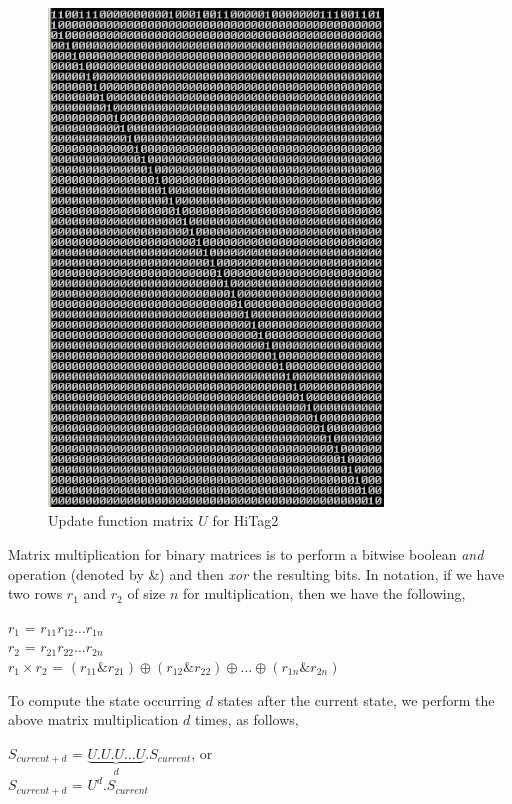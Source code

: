 \begin{figure}[h!]
	\centering
	\includegraphics[width=3.5in]{./figures/hitag2-transition-matrix.png}
	\caption{Update function matrix $U$ for HiTag2}	
	\label{fig:hitag2-transition-matrix}
\end{figure}

Matrix multiplication for binary matrices is to perform a bitwise boolean \emph{and} operation (denoted by \&) and then \emph{xor} the resulting bits. In notation, if we have two rows $r_1$ and $r_2$ of size $n$ for multiplication, then we have the following,

\begin{center}
\large{$r_1$ = $r_{11} r_{12} \ldots r_{1n}$}\\
\large{$r_2$ = $r_{21} r_{22} \ldots r_{2n}$}\\
\large{$r_1 \times r_2$ = $(r_{11} \& r_{21}) \oplus (r_{12} \& r_{22}) \oplus \ldots \oplus (r_{1n} \& r_{2n})$}
\end{center}

To compute the state occurring $d$ states after the current state, we perform the above matrix multiplication $d$ times, as follows,

\begin{center}
\large{$S_{current + d}$ = $\underbrace{U . U . U \dots U}_{d} . S_{current}$}, or\\
\large{$S_{current + d}$ = $U^d . S_{current}$}\\
\end{center}

